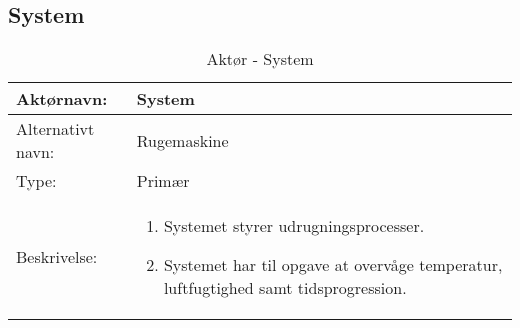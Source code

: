 
\subsection{System}

\begin{table}[H]
\centering
\begin{tabular}[\textwidth]{|p{}|p{}|}
\hline Aktørnavn: & System \\ 
\hline Alternativt navn: & Rugemaskine \\ 
\hline Type: & Primær \\ 
\hline Beskrivelse: & 
		\begin{enumerate}
		\item Systemet styrer udrugningsprocesser.
		\item Systemet har til opgave at overvåge temperatur, luftfugtighed samt tidsprogression.
		\end{enumerate} \\ 
\hline
\end{tabular}
\caption{Aktør - System}
\label{tab:usecase-aktoer-system}
\end{table}

